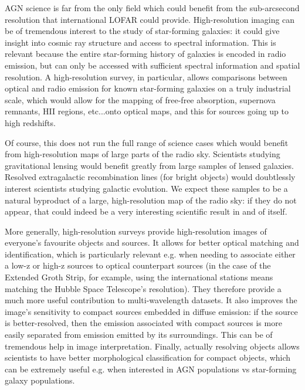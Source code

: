 \pg
AGN science is far from the only field which could benefit from the sub-arcsecond resolution that international LOFAR could provide. High-resolution imaging can be of tremendous interest to the study of star-forming galaxies: it could give insight into cosmic ray structure and access to spectral information. This is relevant because the entire star-forming history of galaxies is encoded in radio emission, but can only be accessed with sufficient spectral information and spatial resolution. A high-resolution survey, in particular, allows comparisons between optical and radio emission for known star-forming galaxies on a truly industrial scale, which would allow for the mapping of free-free absorption, supernova remnants, HII regions, etc...onto optical maps, and this for sources going up to high redshifts.

\pg
Of course, this does not run the full range of science cases which would benefit from high-resolution maps of large parts of the radio sky. Scientists studying gravitational lensing would benefit greatly from large samples of lensed galaxies. Resolved extragalactic recombination lines (for bright objects) would doubtlessly interest scientists studying galactic evolution. We expect these samples to be a natural byproduct of a large, high-resolution map of the radio sky: if they do not appear, that could indeed be a very interesting scientific result in and of itself.

\pg
More generally, high-resolution surveys provide high-resolution images of everyone's favourite objects and sources. It allows for better optical matching and identification, which is particularly relevant e.g. when needing to associate either a low-z or high-z sources to optical counterpart sources (in the case of the Extended Groth Strip, for example, using the international stations means matching the Hubble Space Telescope's resolution). They therefore provide a much more useful contribution to multi-wavelength datasets. It also improves the image's sensitivity to compact sources embedded in diffuse emission: if the source is better-resolved, then the emission associated with compact sources is more easily separated from emission emitted by its surroundings. This can be of tremendous help in image interpretation. Finally, actually resolving objects allows scientists to have better morphological classification for compact objects, which can be extremely useful e.g. when interested in AGN populations vs star-forming galaxy populations.




